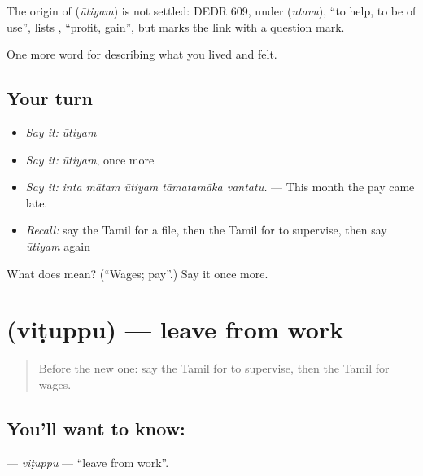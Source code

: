 \begin{cousinweb}
The origin of \textbf{} (\emph{ūtiyam}) is not settled: DEDR 609, under  (\emph{utavu}), \textquotedblleft{}to help, to be of use\textquotedblright{}, lists , \textquotedblleft{}profit, gain\textquotedblright{}, but marks the link with a question mark.
\end{cousinweb}

\begin{grammarlens}[title={What you've built}]
One more word for describing what you lived and felt.
\end{grammarlens}

\subsection*{Your turn}
\begin{itemize}
\raggedright
  \item \emph{Say it:} \emph{ūtiyam}
  \item \emph{Say it:} \emph{ūtiyam}, once more
  \item \emph{Say it:} \emph{inta mātam ūtiyam tāmatamāka vantatu.} — This month the pay came late.
  \item \emph{Recall:} say the Tamil for a file, then the Tamil for to supervise, then say \emph{ūtiyam} again
\end{itemize}

\begin{tcolorbox}[breakable,colback=teal!4,colframe=teal!35!black,title={Before you move on}]
What does  mean? (\textquotedblleft{}Wages; pay\textquotedblright{}.) Say it once more.
\end{tcolorbox}
\section[\texorpdfstring{\ta{விடுப்பு} (viṭuppu)}{விடுப்பு (viṭuppu)}]{ (viṭuppu) — leave from work}

\label{lesson:TA-C508-vituppu}



\begin{quote}
Before the new one: say the Tamil for to supervise, then the Tamil for wages.
\end{quote}

\subsection*{You'll want to know: }
\textbf{} — \emph{viṭuppu} — \textquotedblleft{}leave from work\textquotedblright{}.

